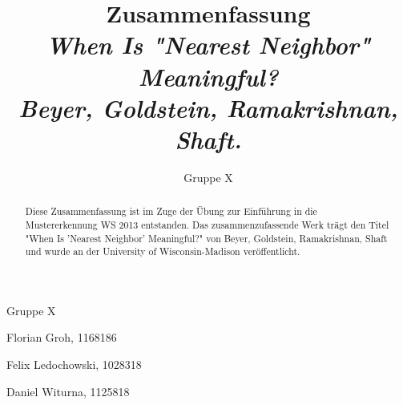 \documentclass{article}
\begin{document}
\title{Zusammenfassung \\ \textit{When Is "Nearest Neighbor" Meaningful? \\ Beyer, Goldstein, Ramakrishnan, Shaft.}}
\author{Gruppe X}

\maketitle

\begin{abstract}
Diese Zusammenfassung ist im Zuge der Übung zur Einführung in die Mustererkennung WS 2013 entstanden. Das zusammenzufassende Werk trägt den Titel "When Is 'Nearest Neighbor' Meaningful?" von Beyer, Goldstein, Ramakrishnan, Shaft und wurde an der University of Wisconsin-Madison veröffentlicht. 
\end{abstract}

\vfill

Gruppe X

Florian Groh, 1168186

Felix Ledochowski, 1028318

Daniel Witurna, 1125818

\pagebreak
\end{document}
